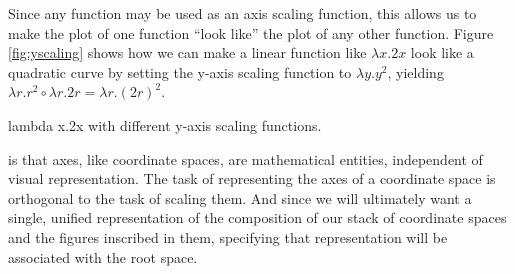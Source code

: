 \documentclass[reqno,12pt]{tufte-handout}
\numberwithin{equation}{subsection}
\numberwithin{equation}{subsection}
\begin{document}
Since any function may be used as an axis scaling function, this
allows us to make the plot of one function ``look like'' the plot of
any other function.  Figure \ref{fig:yscaling} shows how we can make a
linear function like \(\lambda x.2x\) look like a quadratic curve by setting the y-axis
scaling function to \(\lambda y.y^2\), yielding \(\lambda
r.r^2\circ\lambda r.2r = \lambda r.(2r)^2\).

\begin{marginfigure}[12pt]%
\hspace{8pt}
\vspace{12pt}
\caption{lambda x.2x with different y-axis scaling functions.}
\label{fig:yscaling}
\end{marginfigure}%

 is that axes, like coordinate
spaces, are mathematical entities, independent of visual
representation.  The task of representing the axes of a coordinate
space is orthogonal to the task of scaling them.  And since we will
ultimately want a single, unified representation of the composition of
our stack of coordinate spaces and the figures inscribed in them,
specifying that representation will be associated with the root
space.

\end{document}

